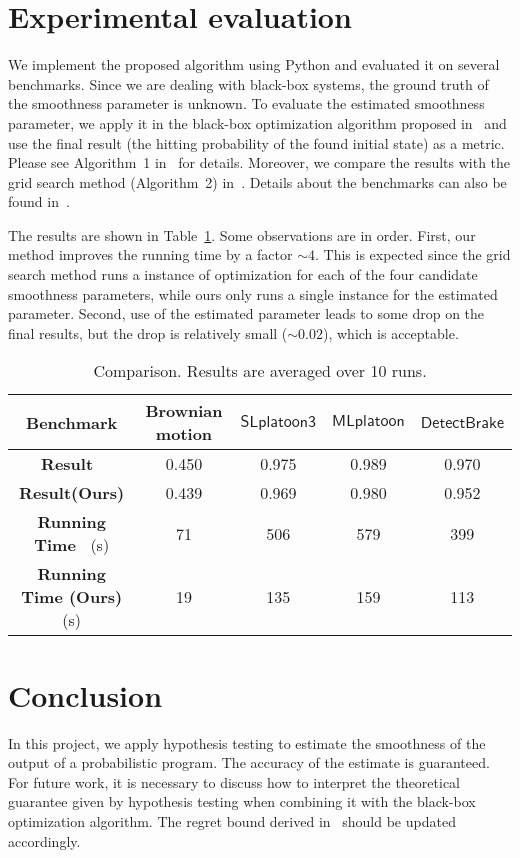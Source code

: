 \documentclass[12pt]{article}
\newcommand{\SlplatoonThree}{{$\mathsf{SLplatoon3}$\xspace}}
\newcommand{\Mlplatoon}{{$\mathsf{MLplatoon}$\xspace}}
\newcommand{\DetectingPedestrian}{{$\mathsf{DetectBrake}$\xspace}}
\begin{document}
\section{Experimental evaluation}
We implement the proposed algorithm using Python and evaluated it on several benchmarks. Since we are dealing with black-box systems, the ground truth of the smoothness parameter is unknown. To evaluate the estimated smoothness parameter, we apply it in the black-box optimization algorithm proposed in~\cite{musavi2019verification} and use the final result (the hitting probability of the found initial state) as a metric. Please see Algorithm~1 in~\cite{musavi2019verification} for details. Moreover, we compare the results with the grid search method (Algorithm~2) in~\cite{musavi2019verification}. Details about the benchmarks can also be found in~\cite{musavi2019verification}.

The results are shown in Table~\ref{tab:results}. Some observations are in order. First, our method improves the running time by a factor $\sim 4$. This is expected since the grid search method runs a instance of optimization for each of the four candidate smoothness parameters, while ours only runs a single instance for the estimated parameter. Second, use of the estimated parameter leads to some drop on the final results, but the drop is relatively small ($\sim 0.02$), which is acceptable. 

\begin{table}[!htpb]
\small 
\centering
\def\arraystretch{1.3}
\setlength\tabcolsep{3pt}
\caption{\small Comparison. Results are averaged over 10 runs.}
\begin{tabular}{|c|c|c|c|c|}
\hline
{\bf Benchmark} & Brownian motion & \SlplatoonThree & \Mlplatoon & \DetectingPedestrian\\
\hline
{\bf Result~\cite{musavi2019verification}} & 0.450 & 0.975 & 0.989 & 0.970\\
\hline
{\bf Result(Ours)} & 0.439 & 0.969 & 0.980 & 0.952\\
\hline
{\bf Running Time~\cite{musavi2019verification}} (s) & 71 & 506 & 579 & 399\\
\hline
{\bf Running Time (Ours)} (s) & 19 & 135 & 159 & 113\\
\hline
\end{tabular}
\label{tab:results}
\end{table}

\section{Conclusion}
In this project, we apply hypothesis testing to estimate the smoothness of the output of a probabilistic program. The accuracy of the estimate is guaranteed. For future work, it is necessary to discuss how to interpret the theoretical guarantee given by hypothesis testing when combining it with the black-box optimization algorithm. The regret bound derived in~\cite{musavi2019verification} should be updated accordingly.


\end{document}
